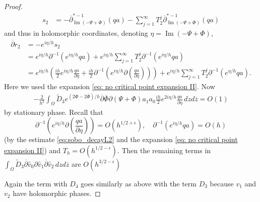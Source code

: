 \documentclass[10pt,a4paper]{amsart}
\DeclareMathOperator {\Imm} {Im}
\newcommand {\p} {\partial}
\newcommand{\Om}{\Omega}
\newcommand{\dbar}{\ol{\p}}
\newcommand{\e}{\epsilon}
\newcommand{\ol}[1]{\overline{#1}}
\newcommand{\op}{\overline \p}
\newcommand{\oz}{\overline{z}}
\begin{document}
\begin{proof}
\begin{align*}
		s_2 &= -\op_{\Imm(-\Psi + \Phi)}^{*-1}(qa) - \sum_{j=1}^{\infty}T_2^j\op_{\Imm(-\Psi + \Phi)}^{*-1}(qa)
	\end{align*}
	and thus in holomorphic coordinates, denoting $\eta= \Imm(-\Psi + \Phi)$,
	\begin{align*}
		\dbar r_2 &= -e^{i\eta/h}s_2\\
		&= e^{i\eta/h}\p^{-1}(e^{i\eta/h}qa) + e^{i\eta/h}\sum_{j=1}^{\infty}T_2^j\p^{-1}(e^{i\eta/h}qa)\\
		&= e^{i\eta/h}\left(\frac{ih}{2}e^{i\eta/h}\frac{qa}{\p\eta} + \frac{ih}{2}\p^{-1}\left(e^{i\eta/h}\p\left(\frac{qa}{\p\eta}\right)\right)\right) + e^{i\eta/h}\sum_{j=1}^{\infty}T_2^j\p^{-1}(e^{\eta/h}qa).
	\end{align*}
    Here we used the expansion \eqref{eq: no critical point expansion II}.
	Now
	\begin{align*}
		-\frac{2}{h^2}\int_{\Om}\tilde D_3 e^{(2\Phi -2\ol{\Phi})/h}\dbar\ol{\Phi}\p(\Psi+\Phi)a_1a_0\frac{ih}{2}e^{2i\eta/h}\frac{qa}{\p\eta}\,dzd\oz = O(1)
	\end{align*}
	by stationary phase.
	Recall that 
    $$\p^{-1}\left(e^{i\eta/h}\p\left(\frac{qa}{\p\eta}\right)\right) = O(h^{1/2+\e}),\quad \p^{-1}(e^{i\eta/h}qa) = O(h)$$
    (by the estimate \eqref{eq:sobo_decayL2} and the expansion \eqref{eq: no critical point expansion II}) and $T_h = O(h^{1/2-\e})$. Then the remaining terms in $\int_{\Om}\tilde D_3 \dbar \hat{v}_0\p \hat{v}_1\dbar \hat{v}_2\,dzd\oz$ are $O(h^{3/2-\e})$
	
	Again the term with $D_4$ goes similarly as above with the term $D_3$ because $v_1$ and $v_2$ have holomorphic phases.
\end{proof}
\end{document}
